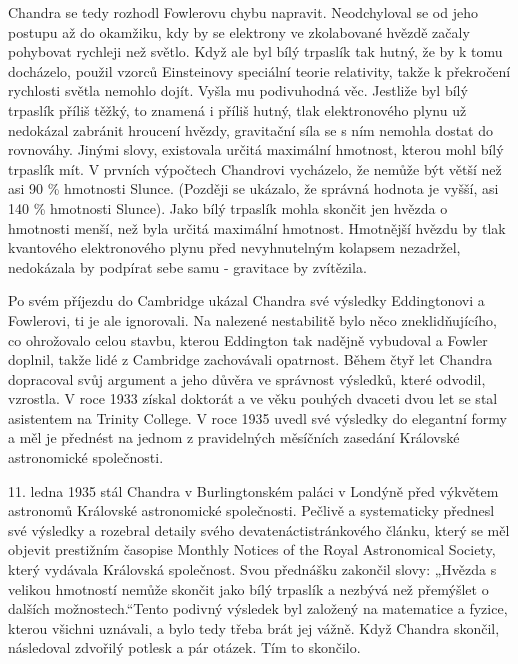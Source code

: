   Chandra se tedy rozhodl Fowlerovu chybu napravit. Neodchyloval se od jeho postupu až do okamžiku,
  kdy by se elektrony ve zkolabované hvězdě začaly pohybovat rychleji než světlo. Když ale byl bílý
  trpaslík tak hutný, že by k tomu docházelo, použil vzorců Einsteinovy speciální teorie relativity,
  takže k překročení rychlosti světla nemohlo dojít. Vyšla mu podivuhodná věc. Jestliže byl bílý
  trpaslík příliš těžký, to znamená i příliš hutný, tlak elektronového plynu už nedokázal zabránit
  hroucení hvězdy, gravitační síla se s ním nemohla dostat do rovnováhy. Jinými slovy, existovala
  určitá maximální hmotnost, kterou mohl bílý trpaslík mít. V prvních výpočtech Chandrovi vycházelo,
  že nemůže být větší než asi 90 \% hmotnosti Slunce. (Později se ukázalo, že správná hodnota je
  vyšší, asi 140 \% hmotnosti Slunce). Jako bílý trpaslík mohla skončit jen hvězda o hmotnosti
  menší, než byla určitá maximální hmotnost. Hmotnější hvězdu by tlak kvantového elektronového plynu
  před nevyhnutelným kolapsem nezadržel, nedokázala by podpírat sebe samu - gravitace by zvítězila.
  
  Po svém příjezdu do Cambridge ukázal Chandra své výsledky Eddingtonovi a Fowlerovi, ti je ale
  ignorovali. Na nalezené nestabilitě bylo něco zneklidňujícího, co ohrožovalo celou stavbu, kterou
  Eddington tak nadějně vybudoval a Fowler doplnil, takže lidé z Cambridge zachovávali opatrnost.
  Během čtyř let Chandra dopracoval svůj argument a jeho důvěra ve správnost výsledků, které
  odvodil, vzrostla. V roce 1933 získal doktorát a ve věku pouhých dvaceti dvou let se stal
  asistentem na Trinity College. V roce 1935 uvedl své výsledky do elegantní formy a měl je přednést
  na jednom z pravidelných měsíčních zasedání Královské astronomické společnosti. 
  
  11. ledna 1935 stál Chandra v Burlingtonském paláci v Londýně před výkvětem astronomů Královské
  astronomické společnosti. Pečlivě a systematicky přednesl své výsledky a rozebral detaily svého
  devatenáctistránkového článku, který se měl objevit prestižním časopise Monthly Notices of the
  Royal Astronomical Society, který vydávala Královská společnost. Svou přednášku zakončil slovy:
  „Hvězda s velikou hmotností nemůže skončit jako bílý trpaslík a nezbývá než přemýšlet o dalších
  možnostech.“Tento podivný výsledek byl založený na matematice a fyzice, kterou všichni uznávali, a
  bylo tedy třeba brát jej vážně. Když Chandra skončil, následoval zdvořilý potlesk a pár otázek.
  Tím to skončilo. 
  
